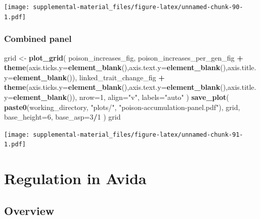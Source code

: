 \documentclass[]{book}
\newenvironment{Shaded}{\begin{snugshade}}{\end{snugshade}}
\newcommand{\DataTypeTok}[1]{\textcolor[rgb]{0.13,0.29,0.53}{#1}}
\newcommand{\DecValTok}[1]{\textcolor[rgb]{0.00,0.00,0.81}{#1}}
\newcommand{\KeywordTok}[1]{\textcolor[rgb]{0.13,0.29,0.53}{\textbf{#1}}}
\newcommand{\NormalTok}[1]{#1}
\newcommand{\OperatorTok}[1]{\textcolor[rgb]{0.81,0.36,0.00}{\textbf{#1}}}
\newcommand{\StringTok}[1]{\textcolor[rgb]{0.31,0.60,0.02}{#1}}
\begin{document}
\texttt{[image: supplemental-material\_files/figure-latex/unnamed-chunk-90-1.pdf]}

\hypertarget{combined-panel-1}{%
\subsection{Combined panel}\label{combined-panel-1}}

\begin{Shaded}
\begin{Highlighting}[]
\NormalTok{grid <-}\StringTok{ }\KeywordTok{plot_grid}\NormalTok{(}
\NormalTok{  poison_increases_fig,}
\NormalTok{  poison_increases_per_gen_fig }\OperatorTok{+}\StringTok{ }\KeywordTok{theme}\NormalTok{(}\DataTypeTok{axis.ticks.y=}\KeywordTok{element_blank}\NormalTok{(),}\DataTypeTok{axis.text.y=}\KeywordTok{element_blank}\NormalTok{(),}\DataTypeTok{axis.title.y=}\KeywordTok{element_blank}\NormalTok{()),}
\NormalTok{  linked_trait_change_fig }\OperatorTok{+}\StringTok{ }\KeywordTok{theme}\NormalTok{(}\DataTypeTok{axis.ticks.y=}\KeywordTok{element_blank}\NormalTok{(),}\DataTypeTok{axis.text.y=}\KeywordTok{element_blank}\NormalTok{(),}\DataTypeTok{axis.title.y=}\KeywordTok{element_blank}\NormalTok{()),}
  \DataTypeTok{nrow=}\DecValTok{1}\NormalTok{,}
  \DataTypeTok{align=}\StringTok{"v"}\NormalTok{,}
  \DataTypeTok{labels=}\StringTok{"auto"}
\NormalTok{)}
\KeywordTok{save_plot}\NormalTok{(}
   \KeywordTok{paste0}\NormalTok{(working_directory, }\StringTok{"plots/"}\NormalTok{, }\StringTok{"poison-accumulation-panel.pdf"}\NormalTok{),}
\NormalTok{   grid,}
   \DataTypeTok{base_height=}\DecValTok{6}\NormalTok{,}
   \DataTypeTok{base_asp=}\DecValTok{3}\OperatorTok{/}\DecValTok{1}
\NormalTok{)}
\NormalTok{grid}
\end{Highlighting}
\end{Shaded}

\texttt{[image: supplemental-material\_files/figure-latex/unnamed-chunk-91-1.pdf]}

\hypertarget{regulation-in-avida}{%
\chapter{Regulation in Avida}\label{regulation-in-avida}}

\hypertarget{overview-4}{%
\section{Overview}\label{overview-4}}
\end{document}
